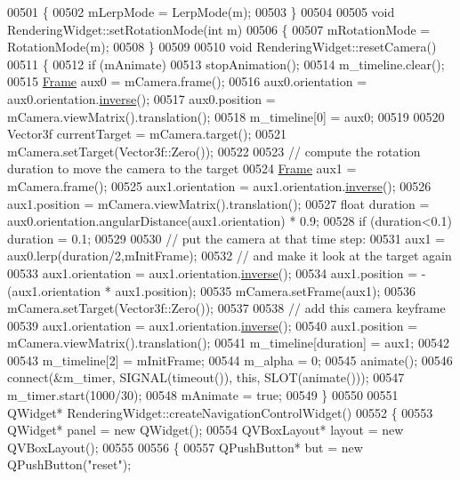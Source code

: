 \begin{DoxyCode}
00501 \{
00502   mLerpMode = LerpMode(m);
00503 \}
00504 
00505 \textcolor{keywordtype}{void} RenderingWidget::setRotationMode(\textcolor{keywordtype}{int} m)
00506 \{
00507   mRotationMode = RotationMode(m);
00508 \}
00509 
00510 \textcolor{keywordtype}{void} RenderingWidget::resetCamera()
00511 \{
00512   \textcolor{keywordflow}{if} (mAnimate)
00513     stopAnimation();
00514   m\_timeline.clear();
00515   \hyperlink{class_frame}{Frame} aux0 = mCamera.frame();
00516   aux0.orientation = aux0.orientation.\hyperlink{group___geometry___module_a6a1d8af1fe34cb4127f705c0d10ef649}{inverse}();
00517   aux0.position = mCamera.viewMatrix().translation();
00518   m\_timeline[0] = aux0;
00519 
00520   Vector3f currentTarget = mCamera.target();
00521   mCamera.setTarget(Vector3f::Zero());
00522 
00523   \textcolor{comment}{// compute the rotation duration to move the camera to the target}
00524   \hyperlink{class_frame}{Frame} aux1 = mCamera.frame();
00525   aux1.orientation = aux1.orientation.\hyperlink{group___geometry___module_a6a1d8af1fe34cb4127f705c0d10ef649}{inverse}();
00526   aux1.position = mCamera.viewMatrix().translation();
00527   \textcolor{keywordtype}{float} duration = aux0.orientation.angularDistance(aux1.orientation) * 0.9;
00528   \textcolor{keywordflow}{if} (duration<0.1) duration = 0.1;
00529 
00530   \textcolor{comment}{// put the camera at that time step:}
00531   aux1 = aux0.lerp(duration/2,mInitFrame);
00532   \textcolor{comment}{// and make it look at the target again}
00533   aux1.orientation = aux1.orientation.\hyperlink{group___geometry___module_a6a1d8af1fe34cb4127f705c0d10ef649}{inverse}();
00534   aux1.position = - (aux1.orientation * aux1.position);
00535   mCamera.setFrame(aux1);
00536   mCamera.setTarget(Vector3f::Zero());
00537 
00538   \textcolor{comment}{// add this camera keyframe}
00539   aux1.orientation = aux1.orientation.\hyperlink{group___geometry___module_a6a1d8af1fe34cb4127f705c0d10ef649}{inverse}();
00540   aux1.position = mCamera.viewMatrix().translation();
00541   m\_timeline[duration] = aux1;
00542 
00543   m\_timeline[2] = mInitFrame;
00544   m\_alpha = 0;
00545   animate();
00546   connect(&m\_timer, SIGNAL(timeout()), \textcolor{keyword}{this}, SLOT(animate()));
00547   m\_timer.start(1000/30);
00548   mAnimate = \textcolor{keyword}{true};
00549 \}
00550 
00551 QWidget* RenderingWidget::createNavigationControlWidget()
00552 \{
00553   QWidget* panel = \textcolor{keyword}{new} QWidget();
00554   QVBoxLayout* layout = \textcolor{keyword}{new} QVBoxLayout();
00555 
00556   \{
00557     QPushButton* but = \textcolor{keyword}{new} QPushButton(\textcolor{stringliteral}{"reset"});

\end{DoxyCode}
